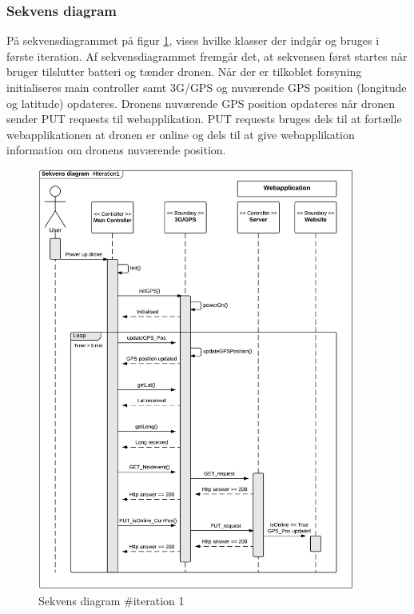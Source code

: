 \newpage
\subsubsection*{Sekvens diagram}
På sekvensdiagrammet på figur \ref{fig:Sekvens_diagram_iteration1}, vises hvilke klasser der indgår og bruges i første iteration. Af sekvensdiagrammet fremgår det, at sekvensen først startes når bruger tilslutter batteri og tænder dronen. Når der er tilkoblet forsyning initialiseres main controller samt 3G/GPS og nuværende GPS position  (longitude og latitude) opdateres. Dronens nuværende GPS position opdateres når dronen sender PUT requests til webapplikation. PUT requests bruges dels til at fortælle webapplikationen at dronen er online og dels til at give webapplikation information om dronens nuværende position. 


\begin{figure}[H]
	\centering
	\includegraphics[width=0.93\textwidth]{Billeder/sekvens/sekvens_iteration1}
	\caption{Sekvens diagram \#iteration 1}
	\label{fig:Sekvens_diagram_iteration1}
\end{figure}
\newpage

